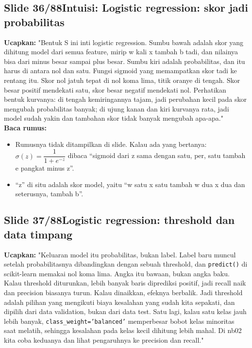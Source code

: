 \documentclass[11pt]{article}
\renewcommand{\framebox}[1]{\colorbox{acc!15}{\textcolor{acc}{\textbf{#1}}}}
\begin{document}
\subsection*{\framebox{Slide 36/88}\quad Intuisi: Logistic regression: skor jadi probabilitas}
\textbf{Ucapkan:} "Bentuk S ini inti logistic regression. Sumbu bawah adalah skor yang dihitung model dari semua feature, mirip w kali x tambah b tadi, dan nilainya bisa dari minus besar sampai plus besar. Sumbu kiri adalah probabilitas, dan itu harus di antara nol dan satu. Fungsi sigmoid yang memampatkan skor tadi ke rentang itu. Skor nol jatuh tepat di nol koma lima, titik oranye di tengah. Skor besar positif mendekati satu, skor besar negatif mendekati nol. Perhatikan bentuk kurvanya: di tengah kemiringannya tajam, jadi perubahan kecil pada skor mengubah probabilitas banyak; di ujung kanan dan kiri kurvanya rata, jadi model sudah yakin dan tambahan skor tidak banyak mengubah apa-apa."\\[2pt]
\textbf{Baca rumus:}\\[2pt]
\begin{itemize}\setlength\itemsep{0.2em}
\item Rumusnya tidak ditampilkan di slide. Kalau ada yang bertanya: $\sigma(z) = \dfrac{1}{1+e^{-z}}$ dibaca ``sigmoid dari z sama dengan satu, per, satu tambah e pangkat minus z''.
\item ``z'' di situ adalah skor model, yaitu ``w satu x satu tambah w dua x dua dan seterusnya, tambah b''.
\end{itemize}

\subsection*{\framebox{Slide 37/88}\quad Logistic regression: threshold dan data timpang}
\textbf{Ucapkan:} "Keluaran model itu probabilitas, bukan label. Label baru muncul setelah probabilitasnya dibandingkan dengan sebuah threshold, dan \texttt{predict()} di scikit-learn memakai nol koma lima. Angka itu bawaan, bukan angka baku. Kalau threshold diturunkan, lebih banyak baris diprediksi positif, jadi recall naik dan precision biasanya turun. Kalau dinaikkan, efeknya berbalik. Jadi threshold adalah pilihan yang mengikuti biaya kesalahan yang sudah kita sepakati, dan dipilih dari data validation, bukan dari data test. Satu lagi, kalau satu kelas jauh lebih banyak, \texttt{class\_weight='balanced'} memperbesar bobot kelas minoritas saat melatih, sehingga kesalahan pada kelas kecil dihitung lebih mahal. Di nb02 kita coba keduanya dan lihat pengaruhnya ke precision dan recall."\\[2pt]
\end{document}
